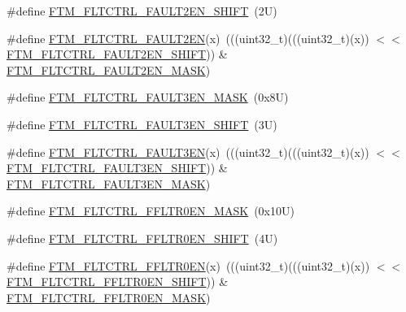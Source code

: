 \begin{DoxyCompactItemize}
\item 
\#define \mbox{\hyperlink{group___f_t_m___register___masks_gaf41dd0966742f642b633ce812a13bfc7}{F\+T\+M\+\_\+\+F\+L\+T\+C\+T\+R\+L\+\_\+\+F\+A\+U\+L\+T2\+E\+N\+\_\+\+S\+H\+I\+FT}}~(2\+U)
\item 
\#define \mbox{\hyperlink{group___f_t_m___register___masks_ga540dc5f265670d1b6e46e1a40f725027}{F\+T\+M\+\_\+\+F\+L\+T\+C\+T\+R\+L\+\_\+\+F\+A\+U\+L\+T2\+EN}}(x)~(((uint32\+\_\+t)(((uint32\+\_\+t)(x)) $<$$<$ \mbox{\hyperlink{group___f_t_m___register___masks_gaf41dd0966742f642b633ce812a13bfc7}{F\+T\+M\+\_\+\+F\+L\+T\+C\+T\+R\+L\+\_\+\+F\+A\+U\+L\+T2\+E\+N\+\_\+\+S\+H\+I\+FT}})) \& \mbox{\hyperlink{group___f_t_m___register___masks_ga1e35c0281db74fb68969c15377596ea5}{F\+T\+M\+\_\+\+F\+L\+T\+C\+T\+R\+L\+\_\+\+F\+A\+U\+L\+T2\+E\+N\+\_\+\+M\+A\+SK}})
\item 
\#define \mbox{\hyperlink{group___f_t_m___register___masks_ga5b3b4ac103a4459ae5ef09d3d83a2352}{F\+T\+M\+\_\+\+F\+L\+T\+C\+T\+R\+L\+\_\+\+F\+A\+U\+L\+T3\+E\+N\+\_\+\+M\+A\+SK}}~(0x8\+U)
\item 
\#define \mbox{\hyperlink{group___f_t_m___register___masks_ga19ffec80742795f21edc0cb15a74cff6}{F\+T\+M\+\_\+\+F\+L\+T\+C\+T\+R\+L\+\_\+\+F\+A\+U\+L\+T3\+E\+N\+\_\+\+S\+H\+I\+FT}}~(3\+U)
\item 
\#define \mbox{\hyperlink{group___f_t_m___register___masks_gac89767de9c5d87936b38decd6da70be0}{F\+T\+M\+\_\+\+F\+L\+T\+C\+T\+R\+L\+\_\+\+F\+A\+U\+L\+T3\+EN}}(x)~(((uint32\+\_\+t)(((uint32\+\_\+t)(x)) $<$$<$ \mbox{\hyperlink{group___f_t_m___register___masks_ga19ffec80742795f21edc0cb15a74cff6}{F\+T\+M\+\_\+\+F\+L\+T\+C\+T\+R\+L\+\_\+\+F\+A\+U\+L\+T3\+E\+N\+\_\+\+S\+H\+I\+FT}})) \& \mbox{\hyperlink{group___f_t_m___register___masks_ga5b3b4ac103a4459ae5ef09d3d83a2352}{F\+T\+M\+\_\+\+F\+L\+T\+C\+T\+R\+L\+\_\+\+F\+A\+U\+L\+T3\+E\+N\+\_\+\+M\+A\+SK}})
\item 
\#define \mbox{\hyperlink{group___f_t_m___register___masks_ga08d69ad3bf701debb5a53bfadbc7031d}{F\+T\+M\+\_\+\+F\+L\+T\+C\+T\+R\+L\+\_\+\+F\+F\+L\+T\+R0\+E\+N\+\_\+\+M\+A\+SK}}~(0x10\+U)
\item 
\#define \mbox{\hyperlink{group___f_t_m___register___masks_gae70106a7899ed40bc3d6252a1826e0eb}{F\+T\+M\+\_\+\+F\+L\+T\+C\+T\+R\+L\+\_\+\+F\+F\+L\+T\+R0\+E\+N\+\_\+\+S\+H\+I\+FT}}~(4\+U)
\item 
\#define \mbox{\hyperlink{group___f_t_m___register___masks_ga66a4409cba2b91c54894340c4881ae2a}{F\+T\+M\+\_\+\+F\+L\+T\+C\+T\+R\+L\+\_\+\+F\+F\+L\+T\+R0\+EN}}(x)~(((uint32\+\_\+t)(((uint32\+\_\+t)(x)) $<$$<$ \mbox{\hyperlink{group___f_t_m___register___masks_gae70106a7899ed40bc3d6252a1826e0eb}{F\+T\+M\+\_\+\+F\+L\+T\+C\+T\+R\+L\+\_\+\+F\+F\+L\+T\+R0\+E\+N\+\_\+\+S\+H\+I\+FT}})) \& \mbox{\hyperlink{group___f_t_m___register___masks_ga08d69ad3bf701debb5a53bfadbc7031d}{F\+T\+M\+\_\+\+F\+L\+T\+C\+T\+R\+L\+\_\+\+F\+F\+L\+T\+R0\+E\+N\+\_\+\+M\+A\+SK}})
$$
\end{DoxyCompactItemize}
